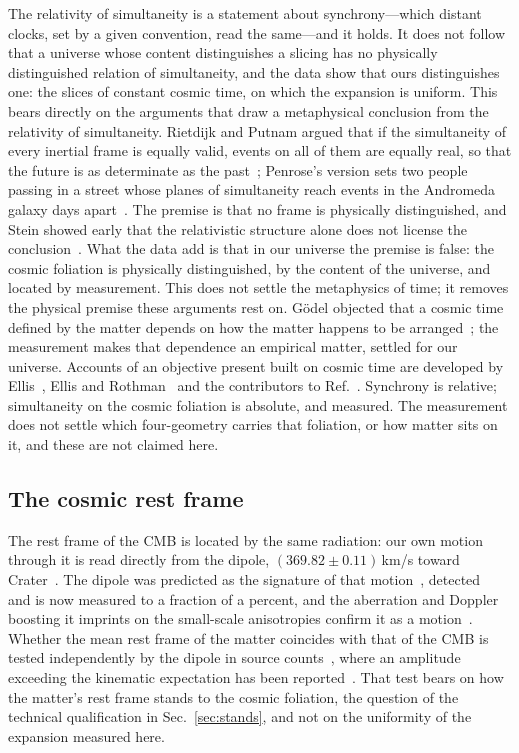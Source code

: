\documentclass[aps,prd,reprint,amsmath,amssymb,superscriptaddress]{revtex4-2}
\begin{document}
The relativity of simultaneity is a statement about synchrony---which distant clocks, set by a given convention, read the same---and it holds. It does not follow that a universe whose content distinguishes a slicing has no physically distinguished relation of simultaneity, and the data show that ours distinguishes one: the slices of constant cosmic time, on which the expansion is uniform. This bears directly on the arguments that draw a metaphysical conclusion from the relativity of simultaneity. Rietdijk and Putnam argued that if the simultaneity of every inertial frame is equally valid, events on all of them are equally real, so that the future is as determinate as the past~\cite{Rietdijk1966, Putnam1967}; Penrose's version sets two people passing in a street whose planes of simultaneity reach events in the Andromeda galaxy days apart~\cite{Penrose1989}. The premise is that no frame is physically distinguished, and Stein showed early that the relativistic structure alone does not license the conclusion~\cite{Stein1968}. What the data add is that in our universe the premise is false: the cosmic foliation is physically distinguished, by the content of the universe, and located by measurement. This does not settle the metaphysics of time; it removes the physical premise these arguments rest on. G\"odel objected that a cosmic time defined by the matter depends on how the matter happens to be arranged~\cite{Godel1949}; the measurement makes that dependence an empirical matter, settled for our universe. Accounts of an objective present built on cosmic time are developed by Ellis~\cite{Ellis2006}, Ellis and Rothman~\cite{EllisRothman2010} and the contributors to Ref.~\cite{CraigSmith2007}. Synchrony is relative; simultaneity on the cosmic foliation is absolute, and measured. The measurement does not settle which four-geometry carries that foliation, or how matter sits on it, and these are not claimed here.

\subsection{The cosmic rest frame}

The rest frame of the CMB is located by the same radiation: our own motion through it is read directly from the dipole, $(369.82\pm0.11)$\,km/s toward Crater~\cite{Planck2018I}. The dipole was predicted as the signature of that motion~\cite{PeeblesWilkinson1968}, detected~\cite{Smoot1977} and is now measured to a fraction of a percent, and the aberration and Doppler boosting it imprints on the small-scale anisotropies confirm it as a motion~\cite{Planck2013XXVII}. Whether the mean rest frame of the matter coincides with that of the CMB is tested independently by the dipole in source counts~\cite{EllisBaldwin1984}, where an amplitude exceeding the kinematic expectation has been reported~\cite{Secrest2021, Secrest2025}. That test bears on how the matter's rest frame stands to the cosmic foliation, the question of the technical qualification in Sec.~\ref{sec:stands}, and not on the uniformity of the expansion measured here.
\end{document}

